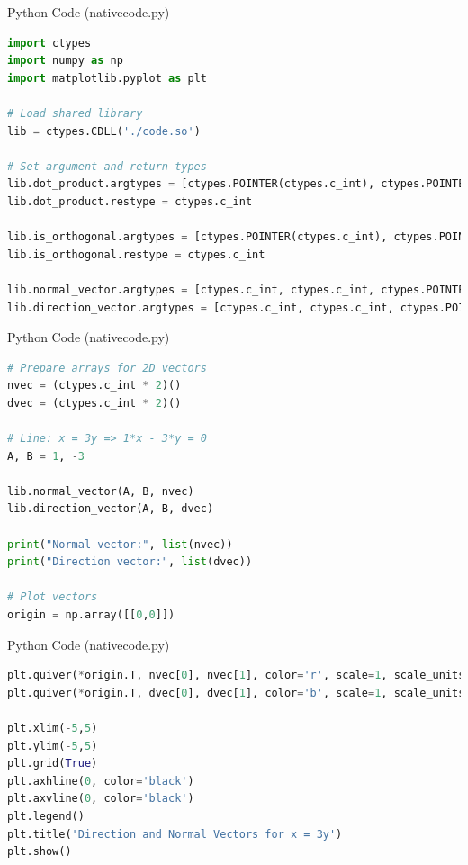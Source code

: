 \documentclass{beamer}
\begin{document}
\begin{frame}[fragile]{Python Code (nativecode.py)}
\begin{lstlisting}[language=Python]
import ctypes
import numpy as np
import matplotlib.pyplot as plt

# Load shared library
lib = ctypes.CDLL('./code.so')

# Set argument and return types
lib.dot_product.argtypes = [ctypes.POINTER(ctypes.c_int), ctypes.POINTER(ctypes.c_int), ctypes.c_int]
lib.dot_product.restype = ctypes.c_int

lib.is_orthogonal.argtypes = [ctypes.POINTER(ctypes.c_int), ctypes.POINTER(ctypes.c_int), ctypes.c_int]
lib.is_orthogonal.restype = ctypes.c_int

lib.normal_vector.argtypes = [ctypes.c_int, ctypes.c_int, ctypes.POINTER(ctypes.c_int)]
lib.direction_vector.argtypes = [ctypes.c_int, ctypes.c_int, ctypes.POINTER(ctypes.c_int)]
\end{lstlisting}
\end{frame}
\begin{frame}[fragile]{Python Code (nativecode.py)}
\begin{lstlisting}[language=Python]
# Prepare arrays for 2D vectors
nvec = (ctypes.c_int * 2)()
dvec = (ctypes.c_int * 2)()

# Line: x = 3y => 1*x - 3*y = 0
A, B = 1, -3

lib.normal_vector(A, B, nvec)
lib.direction_vector(A, B, dvec)

print("Normal vector:", list(nvec))
print("Direction vector:", list(dvec))

# Plot vectors
origin = np.array([[0,0]])
\end{lstlisting}
\end{frame}
\begin{frame}[fragile]{Python Code (nativecode.py)}
\begin{lstlisting}[language=Python]
plt.quiver(*origin.T, nvec[0], nvec[1], color='r', scale=1, scale_units='xy', angles='xy', label='Normal')
plt.quiver(*origin.T, dvec[0], dvec[1], color='b', scale=1, scale_units='xy', angles='xy', label='Direction')

plt.xlim(-5,5)
plt.ylim(-5,5)
plt.grid(True)
plt.axhline(0, color='black')
plt.axvline(0, color='black')
plt.legend()
plt.title('Direction and Normal Vectors for x = 3y')
plt.show()
\end{lstlisting}
\end{frame}
\end{document}
